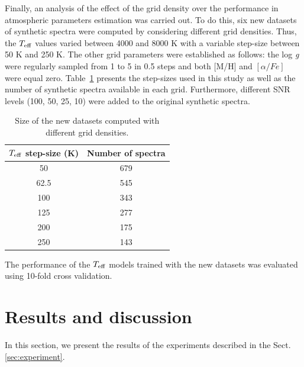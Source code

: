 \documentclass[a4paper,fleqn,usenatbib]{mnras}
\begin{document}
Finally, an analysis of the effect of the grid density over the 
performance in atmospheric parameters estimation was carried out. 
To do this, six new datasets of synthetic spectra were computed
by considering different grid densities. Thus, the $T_{\rm eff}$ 
values varied between 4000 and 8000 K with a variable step-size 
between 50 K and 250 K. The other grid parameters were established 
as follows: the log \textit{g} were regularly sampled from 1 to 5 
in 0.5 steps and both [M/H] and $\left[ \alpha/Fe \right]$ were 
equal zero. Table~\ref{tab:grid} presents the step-sizes used in this 
study as well as the number of synthetic spectra available in each grid.
Furthermore, different SNR levels (100, 50, 25, 10) were added to
the original synthetic spectra.

\begin{table}
\centering
\caption{Size of the new datasets computed with different grid densities.}
\label{tab:grid}
\begin{tabular}{c c}
\hline
\textbf{$T_{\rm eff}$ step-size (K)} & \textbf{Number of spectra} \\
\hline
50 & 679 \\
62.5 & 545 \\
100 & 343 \\
125 & 277 \\
200 & 175\\
250 & 143\\
\hline
\end{tabular}
\end{table}

The performance of the $T_{\rm eff}$ models trained with the new 
datasets was evaluated using 10-fold cross validation.

\section{Results and discussion}
\label{sec:results}
In this section, we present the results of the experiments 
  described in the Sect. \ref{sec:experiment}.
\end{document}
